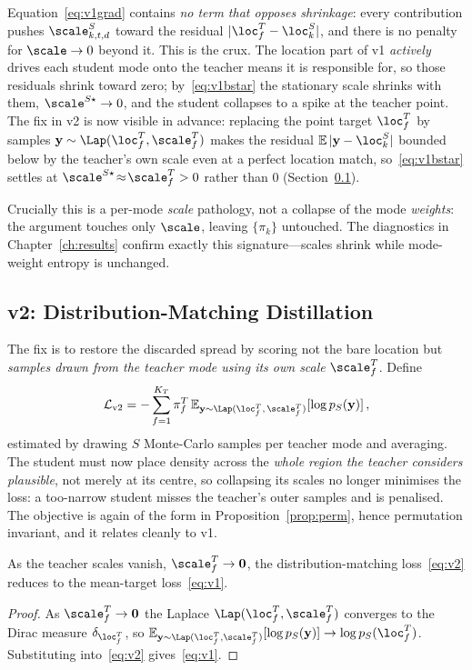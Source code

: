 Equation~\eqref{eq:v1grad} contains \emph{no term that opposes shrinkage}: every
contribution pushes $\scale^S_{k,t,d}$ toward the residual $|\loc^T_f-\loc^S_k|$,
and there is no penalty for $\scale\to0$ beyond it. This is the crux. The location
part of v1 \emph{actively} drives each student mode onto the teacher means it is
responsible for, so those residuals shrink toward zero; by~\eqref{eq:v1bstar} the
stationary scale shrinks with them, $\scale^{S\star}\to0$, and the student collapses
to a spike at the teacher point. The fix in v2 is now visible in advance: replacing
the point target $\loc^T_f$ by samples $\mathbf{y}\sim\Lap(\loc^T_f,\scale^T_f)$
makes the residual $\mathbb{E}\,|\mathbf{y}-\loc^S_k|$ bounded below by the
teacher's own scale even at a perfect location match, so~\eqref{eq:v1bstar} settles
at $\scale^{S\star}\!\approx\!\scale^T_f>0$ rather than $0$
(Section~\ref{ssec:method_v2}).

Crucially this is a per-mode \emph{scale} pathology, not a collapse of the mode
\emph{weights}: the argument touches only $\scale$, leaving $\{\pi_k\}$ untouched.
The diagnostics in Chapter~\ref{ch:results} confirm exactly this signature---scales
shrink while mode-weight entropy is unchanged.

\subsection{v2: Distribution-Matching Distillation}
\label{ssec:method_v2}
The fix is to restore the discarded spread by scoring not the bare location but
\emph{samples drawn from the teacher mode using its own scale} $\scale^T_f$. Define
\begin{equation}
  \label{eq:v2}
  \mathcal{L}_{\mathrm{v2}}
    = -\sum_{f=1}^{K_T} \pi^T_f \,
       \mathbb{E}_{\mathbf{y}\sim \Lap(\loc^T_f,\,\scale^T_f)}
        \!\left[\log p_S(\mathbf{y})\right],
\end{equation}
estimated by drawing $S$ Monte-Carlo samples per teacher mode and averaging. The
student must now place density across the \emph{whole region the teacher considers
plausible}, not merely at its centre, so collapsing its scales no longer minimises
the loss: a too-narrow student misses the teacher's outer samples and is penalised.
The objective is again of the form in Proposition~\ref{prop:perm}, hence
permutation invariant, and it relates cleanly to v1.

\begin{prop}[v2 generalises v1]
\label{prop:limit}
As the teacher scales vanish, $\scale^T_f\to\mathbf{0}$, the distribution-matching
loss~\eqref{eq:v2} reduces to the mean-target loss~\eqref{eq:v1}.
\end{prop}
\begin{proof}
As $\scale^T_f\to\mathbf{0}$ the Laplace $\Lap(\loc^T_f,\scale^T_f)$ converges to the
Dirac measure $\delta_{\loc^T_f}$, so
$\mathbb{E}_{\mathbf{y}\sim\Lap(\loc^T_f,\scale^T_f)}[\log p_S(\mathbf{y})]
\to \log p_S(\loc^T_f)$. Substituting into~\eqref{eq:v2} gives~\eqref{eq:v1}.
\end{proof}

